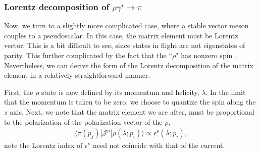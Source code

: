 \subsubsection{Lorentz decomposition of $\rho\gamma^\star\to\pi$}

Now, we turn to a slightly more complicated case, where a stable vector meson couples to a pseudoscalar.  In this case, the matrix element must be Lorentz vector. This is a bit difficult to see, since states in flight are not eigenstates of parity. This further complicated by the fact that the ``$\rho$" has nonzero spin~\cite{Thomas:2011rh}. Nevertheless, we can derive the form of the Lorentz decomposition of the matrix element in a relatively straightforward manner.

First, the $\rho$ state is now defined by its momentum and helicity, $\lambda$. In the limit that the momentum is taken to be zero, we choose to quantize the spin along the $z$ axis.  Next, we note that the matrix element we are after, must be proportional to the polarization of the polarization vector of the $\rho$,
\begin{align}
\langle \pi(p_f)|\mathcal{J}^\mu|\rho(\lambda; p_i)\rangle\propto \epsilon^\nu(\lambda; p_i),
\end{align}
note the Lorentz index of $\epsilon^\nu$ need not coincide with that of the current. 

